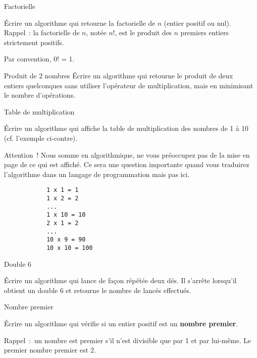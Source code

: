 	\begin{Exercice}{Factorielle}

		Écrire un algorithme qui retourne la factorielle de $n$ (entier positif ou
		nul). Rappel~: la factorielle de $n$, notée $n$!, est le produit des $n$
		premiers entiers strictement positifs. 

		Par convention, 0! = 1.
	\end{Exercice}

	\begin{Exercice}{Produit de 2 nombres}
		Écrire un algorithme qui retourne le produit de deux entiers quelconques
		sans utiliser l’opérateur de multiplication, mais en minimisant le
		nombre d’opérations.
	\end{Exercice}

	\begin{Exercice}{Table de multiplication}

		\begin{minipage}[t]{10cm}
			Écrire un algorithme qui affiche la table de multiplication
			des nombres de 1 à 10
			(cf. l’exemple ci-contre).

			\medskip
			Attention~! Nous somme en algorithmique, 
			ne vous préoccupez pas de la mise en page de ce qui est affiché.
			Ce sera une question importante quand vous traduirez 
			l’algorithme dans un langage de programmation mais pas ici. 
		\end{minipage}
		\qquad
		\begin{minipage}[t]{4cm}
			\begin{verbatim}
			1 x 1 = 1
			1 x 2 = 2
			...
			1 x 10 = 10
			2 x 1 = 2
			...
			10 x 9 = 90
			10 x 10 = 100
			\end{verbatim}
		\end{minipage}		
	\end{Exercice}

	\begin{Exercice}{Double 6}

		Écrire un algorithme qui lance de façon répétée deux dés.
		Il s’arrête lorsqu’il obtient un double 6
		et retourne le nombre de lancés effectués.
	\end{Exercice}

	\begin{Exercice}{Nombre premier}

		Écrire un algorithme qui vérifie si un entier positif est un
		\textbf{nombre premier}. 

		Rappel~:~un nombre est premier s’il n’est divisible que par 1 et par
		lui-même. Le premier nombre premier est 2.
	\end{Exercice}

